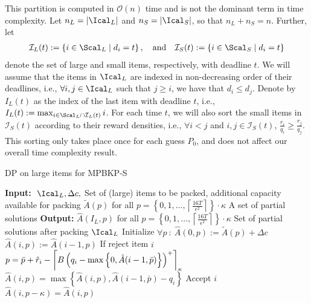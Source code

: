 \documentclass[11pt]{article}
\begin{document}
This partition is computed in $\mathcal{O}(n)$ time and is not the dominant term in time complexity. Let $n_L = |\Ical_L|$ and $n_S=|\Ical_S|$, so that $n_L+n_S=n$. 
Further, let 
\begin{align*}
\mathcal{I}_L(t) := \left\{i\in \Scal_L\mid d_i = t\right\}, \quad  \mbox{and} \quad 
\mathcal{I}_S(t) := \left\{i\in \Scal_S\mid d_i = t\right\}
\end{align*}
denote the set of large and small items, respectively, with deadline $t$. 
We will assume that the items in $\Ical_L$ are indexed in non-decreasing order of their deadlines, i.e., $\forall i,j\in \Ical_L$ such that $j\ge i$, we have that $ d_i\le d_j$. Denote by $I_L(t)$ as the index of the last item with deadline $t$, i.e., $I_L(t):= \max_{i\in \Scal_L\cap \mathcal{I}_L(t)} i$. 
For each time $t$, we will also sort the small items in $\mathcal{I}_S(t)$ according to their reward densities, i.e., $\forall i<j$ and $i,j\in \mathcal{I}_S(t)$, $\frac{r_i}{q_i}\ge \frac{r_j}{q_j}$. This sorting only takes place once for each guess $P_0$, and does not affect our overall time complexity result. \\



\begin{algorithm}[ht]
\footnotesize
\caption{DP on large items for MPBKP-S}
\label{alg:FPTAS_nTlogn_large2}
\begin{algorithmic}[1]
	\Statex \textbf{Input:} $\ \Ical_L, \Delta c,$  \Comment Set of (large) items to be packed, additional capacity available for packing
	\Statex \hspace{0.35in}	$\widetilde{A}(p)$ for all $p = \left\{ 0, 1, \ldots,\left\lceil\frac{16T}{\epsilon^2}\right\rceil \right\} \cdot \kappa $ \Comment A set of partial solutions 
	\Statex \textbf{Output:} $\hat{A}(I_L,p)$ for all $p = \left\{ 0, 1, \ldots,\left\lceil\frac{16T}{\epsilon^2}\right\rceil \right\} \cdot \kappa $ \Comment Set of partial solutions after packing $\Ical_L$
	\State Initialize $\forall p \ : \ \hat{A}(0,p) := \widetilde{A}(p) + \Delta c$	
	\State $\hat{A}(i,p) := \hat{A}(i-1, p)$ 
	\Comment If reject item $i$
	\EndFor
	\State ${p} = \bar{p} + \hat{r}_i - \left\lceil B\left(q_i - {\color{black}\max\left\{0, \hat{A}(i-1,\bar{p})\right\}}\right)^+\right\rceil_{\kappa}$
	\State $\hat{A}(i, p) = \max\left\{ \hat{A}(i,p ), \hat{A}(i-1,\bar{p}) - q_i \right\}$		\Comment Accept $i$
	\EndFor
	\vspace{0.1cm}
	\vspace{0.1cm}
	\State $\hat{A}(i,p-\kappa) = \hat{A}(i,p)$
	\EndIf
	\EndFor
	\EndFor
\end{algorithmic}
\end{algorithm}
\end{document}
